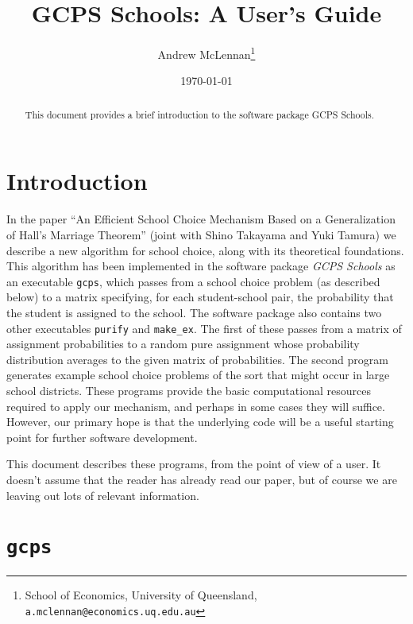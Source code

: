 \documentclass[12pt]{article}
\theoremstyle{definition}
\begin{document}
\title{GCPS Schools: A User's Guide}

\author{Andrew McLennan\footnote{School of Economics, University of
    Queensland, {\tt a.mclennan@economics.uq.edu.au}}}

\date{\today}

\maketitle

\begin{abstract}
This document provides a brief introduction to the software package GCPS Schools.
\end{abstract}


\section{Introduction}

In the paper ``An Efficient School Choice Mechanism Based on a
Generalization of Hall's Marriage Theorem'' (joint with Shino Takayama
and Yuki Tamura) we describe a new algorithm for school choice, along
with its theoretical foundations.  This algorithm has been implemented
in the software package \emph{GCPS Schools} as an executable
\texttt{gcps}, which passes from a school choice problem (as described
below) to a matrix specifying, for each student-school pair, the
probability that the student is assigned to the school.  The software
package also contains two other executables \texttt{purify} and
\texttt{make\_ex}.  The first of these passes from a matrix of
assignment probabilities to a random pure assignment whose probability
distribution averages to the given matrix of probabilities.  The
second program generates example school choice problems of the sort
that might occur in large school districts.  These programs provide
the basic computational resources required to apply our mechanism, and
perhaps in some cases they will suffice.  However, our primary hope is
that the underlying code will be a useful starting point for further
software development.

This document describes these programs, from the point of view of a
user.  It doesn't assume that the reader has already read our paper,
but of course we are leaving out lots of relevant information.

\section{\texttt{gcps}}
\end{document}
